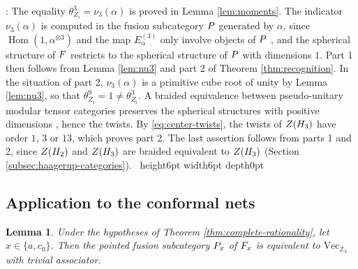 \documentclass[leqno]{article}
\let\cal\relax
\newcommand{\cal}{\mathcal}
\newcommand{\Z}{\ensuremath{\mathbb{Z}}}
\newcommand{\qed}{\hfill \vrule height6pt  width6pt depth0pt}
\newcommand{\ot}{\otimes}
\newtheorem{lemma}[thm]{Lemma}
\newenvironment{proof}[1][]{\noindent {\it Proof #1} : }{\hbox{~}\qed
\smallskip
}
\numberwithin{equation}{section}
\begin{document}
\begin{proof}
The equality $\theta_{Z_i}^3 = \nu_3(\alpha)$ is proved in Lemma \ref{lem:moments}. The indicator $\nu_3(\alpha)$ is computed in the fusion subcategory $\cal P$ generated by $\alpha$, since $\operatorname{Hom}(1,\alpha^{\ot 3})$ and the map $E^{(3)}_\alpha$ only involve objects of $\cal P$ \cite[p.~31]{NS07}, and the spherical structure of $\cal F$ restricts to the spherical structure of $\cal P$ with dimensions $1$. Part 1 then follows from Lemma \ref{lem:nu3} and part 2 of Theorem \ref{thm:recognition}. In the situation of part 2, $\nu_3(\alpha)$ is a primitive cube root of unity by Lemma \ref{lem:nu3}, so that $\theta_{Z_i}^9 = 1 \neq \theta_{Z_i}^3$. A braided equivalence between pseudo-unitary modular tensor categories preserves the spherical structures with positive dimensions \cite[Proposition 8.23 p.~34]{ENO05}, hence the twists. By \eqref{eq:center-twists}, the twists of $Z(\cal H_3)$ have order $1$, $3$ or $13$, which proves part 2. The last assertion follows from parts 1 and 2, since $Z(\cal H_2)$ and $Z(\cal H_3)$ are braided equivalent to $Z(\cal H_3)$ (Section \ref{subsec:haagerup-categories}).
\end{proof}



\subsection{Application to the conformal nets}
\label{subsec:recognition-nets}

\begin{lemma}
\label{lem:trivial-associator}
Under the hypotheses of Theorem \ref{thm:complete-rationality}, let $x \in \{a,c_0\}$. Then the pointed fusion subcategory $\cal P_x$ of $\cal F_x$ is equivalent to $\mathrm{Vec}_{\Z_3}$ with trivial associator.
\end{lemma}
\end{document}
